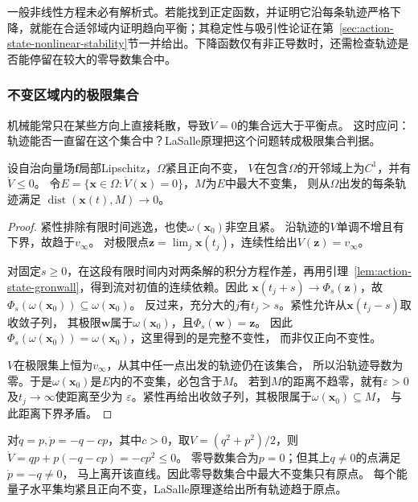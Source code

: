 一般非线性方程未必有解析式。若能找到正定函数，并证明它沿每条轨迹严格下降，就能在合适邻域内证明趋向平衡；其稳定性与吸引性论证在第~\ref{sec:action-state-nonlinear-stability}节一并给出。下降函数仅有非正导数时，还需检查轨迹是否能停留在较大的零导数集合中。

\subsubsection{不变区域内的极限集合}
机械能常只在某些方向上直接耗散，导致$\dot V=0$的集合远大于平衡点。
这时应问：轨迹能否一直留在这个集合中？LaSalle原理把这个问题转成极限集合判据。
\begin{theorem}[LaSalle不变性原理]
  \label{thm:dynamical-lasalle-invariance}
  设自治向量场$\bm f$局部Lipschitz，$\Omega$紧且正向不变，
  $V$在包含$\Omega$的开邻域上为$C^1$，并有$\dot V\leq0$。
  令$E=\{\bm x\in\Omega:\dot V(\bm x)=0\}$，$M$为$E$中最大不变集，
  则从$\Omega$出发的每条轨迹满足
  $\operatorname{dist}(\bm x(t),M)\to0$。
\end{theorem}
\begin{proof}
  紧性排除有限时间逃逸，也使$\omega(\bm x_0)$非空且紧。
  沿轨迹的$V$单调不增且有下界，故趋于$v_\infty$。
  对极限点$\bm z=\lim_j\bm x(t_j)$，连续性给出$V(\bm z)=v_\infty$。

  对固定$s\geq0$，在这段有限时间内对两条解的积分方程作差，再用引理~\ref{lem:action-state-gronwall}，得到流对初值的连续依赖。因此
  $\bm x(t_j+s)\to\Phi_s(\bm z)$，故
  $\Phi_s(\omega(\bm x_0))\subseteq\omega(\bm x_0)$。
  反过来，充分大的$j$有$t_j>s$。紧性允许从$\bm x(t_j-s)$取收敛子列，
  其极限$\bm w$属于$\omega(\bm x_0)$，且$\Phi_s(\bm w)=\bm z$。
  因此$\Phi_s(\omega(\bm x_0))=\omega(\bm x_0)$，这里得到的是完整不变性，
  而非仅正向不变性。

  $V$在极限集上恒为$v_\infty$，从其中任一点出发的轨迹仍在该集合，
  所以沿轨迹导数为零。于是$\omega(\bm x_0)$是$E$内的不变集，必包含于$M$。
  若到$M$的距离不趋零，就有$\varepsilon>0$及$t_j\to\infty$使距离至少为
  $\varepsilon$。紧性再给出收敛子列，其极限属于$\omega(\bm x_0)\subseteq M$，
  与此距离下界矛盾。
\end{proof}

\begin{example}[阻尼振子的零导数集合]
  \label{ex:dynamical-damped-oscillator-lasalle}
  对$\dot q=p,\dot p=-q-cp$，其中$c>0$，取$V=(q^2+p^2)/2$，则
  $\dot V=q p+p(-q-cp)=-cp^2\leq0$。
  零导数集合为$p=0$；但其上$q\neq0$的点满足$\dot p=-q\neq0$，
  马上离开该直线。因此零导数集合中最大不变集只有原点。
  每个能量子水平集均紧且正向不变，LaSalle原理遂给出所有轨迹趋于原点。
\end{example}

